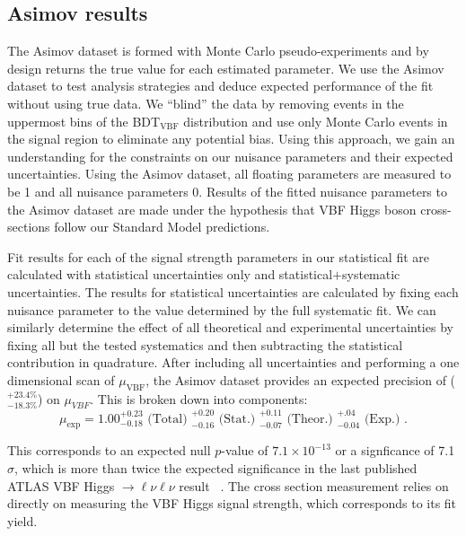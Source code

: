 \subsection{Asimov results}
The Asimov dataset is formed with Monte Carlo pseudo-experiments and by design returns the true value for each estimated parameter. We use the Asimov dataset to test analysis strategies and deduce expected performance of the fit without using true data. We ``blind'' the data by removing events in the uppermost bins of the BDT$_{\text{VBF}}$ distribution and use only Monte Carlo events in the signal region to eliminate any potential bias. Using this approach, we gain an understanding for the constraints on our nuisance parameters and their expected uncertainties. Using the Asimov dataset, all floating parameters are measured to be 1 and all nuisance parameters 0. Results of the fitted nuisance parameters to the Asimov dataset are made under the hypothesis that VBF Higgs boson cross-sections follow our Standard Model predictions. 

Fit results for each of the signal strength parameters in our statistical fit are calculated with statistical uncertainties only and statistical$+$systematic uncertainties. The results for statistical uncertainties are calculated by fixing each nuisance parameter to the value determined by the full systematic fit. We can similarly determine the effect of all theoretical and experimental uncertainties by fixing all but the tested systematics and then subtracting the statistical contribution in quadrature. After including all uncertainties and performing a one dimensional scan of $\mu_\text{VBF}$, the Asimov dataset provides an expected precision of ($^{+23.4\%}_{-18.3\%}$) on $\mu_{VBF}$. This is broken down into components:
\begin{equation}
\mu_{\text{exp}} = 1.00 ^{+0.23}_{-0.18} \text{ (Total) } ^{+0.20}_{-0.16} \text{ (Stat.) } ^{+0.11}_{-0.07} \text{ (Theor.) } ^{+.04}_{-0.04} \text{ (Exp.) }.
\end{equation}

This corresponds to an expected null $p$-value of $7.1\times10^{-13}$ or a signficance of 7.1$\sigma$, which is more than twice the expected significance in the last published ATLAS VBF Higgs $\rightarrow \ell\nu\ell\nu$ result ~\cite{Aaboud_2019}.  The cross section measurement relies on directly on measuring the VBF Higgs signal strength, which corresponds to its fit yield. 

